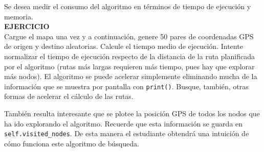 \documentclass{article}
\begin{document}
\begin{exercise}
Se desea medir el consumo del algoritmo en términos de tiempo de ejecución y memoria.\\
\textbf{EJERCICIO}\\
Cargue el mapa una vez y a continuación, genere 50 pares de coordenadas GPS de origen y destino aleatorias. Calcule el tiempo medio de ejecución. Intente normalizar el tiempo de ejecución respecto de la distancia de la ruta planificada por el algoritmo (rutas más largas requieren más tiempo, pues hay que explorar más nodos). El algoritmo se puede acelerar simplemente eliminando mucha de la información que se muestra por pantalla con \texttt{print()}. Busque, también, otras formas de acelerar el cálculo de las rutas.
\end{exercise}

\begin{exercise}
También resulta interesante que se plotee la posición GPS de todos los nodos que ha ido explorando el algoritmo. Recuerde que esta información se guarda en \texttt{self.visited\_nodes}. De esta manera el estudiante obtendrá una intuición de cómo funciona este algoritmo de búsqueda.
\end{exercise}
\end{document}
